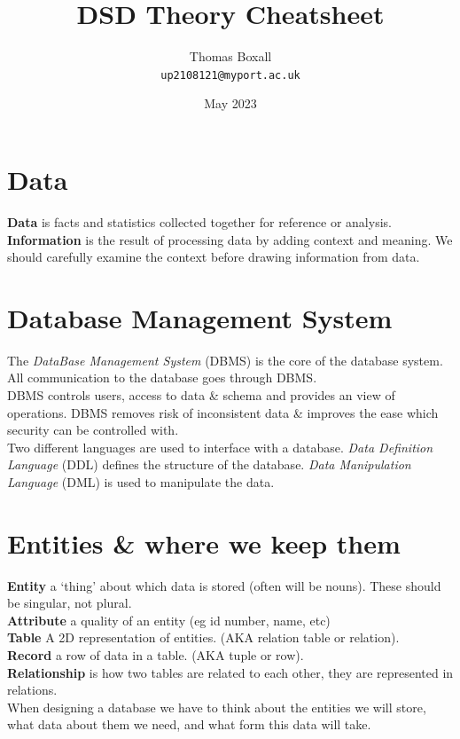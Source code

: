 \documentclass[a4paper,11pt]{article}
\title{DSD Theory Cheatsheet}
\author{Thomas Boxall\\ \texttt{up2108121@myport.ac.uk}}
\date{May 2023}
\begin{document}
\maketitle
\thispagestyle{fancy}

\section{Data}
\textbf{Data} is facts and statistics collected together for reference or analysis.\\
\textbf{Information} is the result of processing data by adding context and meaning. We should carefully examine the context before drawing information from data.

\section{Database Management System}
The \textit{DataBase Management System} (DBMS) is the core of the database system. All communication to the database goes through DBMS. \\
DBMS controls users, access to data \& schema and provides an view of operations. DBMS removes risk of inconsistent data \& improves the ease which security can be controlled with.\\
Two different languages are used to interface with a database. \textit{Data Definition Language} (DDL) defines the structure of the database. \textit{Data Manipulation Language} (DML) is used to manipulate the data. 

\section{Entities \& where we keep them}
\textbf{Entity} a `thing' about which data is stored (often will be nouns). These should be singular, not plural.\\
\textbf{Attribute} a quality of an entity (eg id number, name, etc)\\
\textbf{Table} A 2D representation of entities. (AKA relation table or relation).\\
\textbf{Record} a row of data in a table. (AKA tuple or row).\\
\textbf{Relationship} is how two tables are related to each other, they are represented in relations. \\
When designing a database we have to think about the entities we will store, what data about them we need, and what form this data will take.
\end{document}
